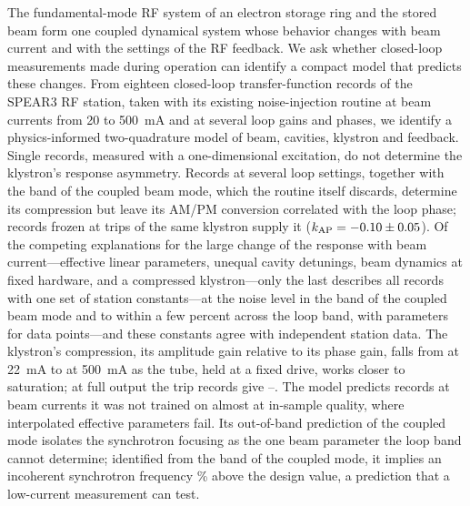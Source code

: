 The fundamental-mode RF system of an electron storage ring and the stored beam form one coupled dynamical system whose behavior changes with beam current and with the settings of the RF feedback. We ask whether closed-loop measurements made during operation can identify a compact model that predicts these changes. From eighteen closed-loop transfer-function records of the SPEAR3 RF station, taken with its existing noise-injection routine at beam currents from 20 to \SI{500}{mA} and at several loop gains and phases, we identify a physics-informed two-quadrature model of beam, cavities, klystron and feedback. Single records, measured with a one-dimensional excitation, do not determine the klystron's response asymmetry. Records at several loop settings, together with the band of the coupled beam mode, which the routine itself discards, determine its compression but leave its AM/PM conversion correlated with the loop phase; records frozen at trips of the same klystron supply it ($k_\mathrm{AP}=-0.10\pm0.05$). Of the competing explanations for the large change of the response with beam current---effective linear parameters, unequal cavity detunings, beam dynamics at fixed hardware, and a compressed klystron---only the last describes all records with one set of station constants---at the noise level in the band of the coupled beam mode and to within a few percent across the loop band, with \nparSel{} parameters for \nPoints{} data points---and these constants agree with independent station data. The klystron's compression, its amplitude gain relative to its phase gain, falls from \gaSelLow{} at \SI{22}{mA} to \gaSelHighLo{} at \SI{500}{mA} as the tube, held at a fixed drive, works closer to saturation; at full output the trip records give \tripGAHigh--\tripGAFull. The model predicts records at beam currents it was not trained on almost at in-sample quality, where interpolated effective parameters fail. Its out-of-band prediction of the coupled mode isolates the synchrotron focusing as the one beam parameter the loop band cannot determine; identified from the band of the coupled mode, it implies an incoherent synchrotron frequency \fsRatio\% above the design value, a prediction that a low-current measurement can test.
